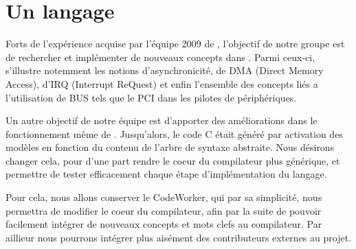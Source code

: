 \documentclass{rtxreport}
\begin{document}
\section{Un langage}

Forts de l'expérience acquise par l'équipe 2009 de \rtx, l'objectif de
notre groupe est de rechercher et implémenter de nouveaux concepts dans
\rtx. Parmi ceux-ci, s'illustre notemment les notions d'asynchronicité,
de DMA (Direct Memory Access), d'IRQ (Interrupt ReQuest) et enfin l'ensemble
des concepts liés a l'utilisation de BUS tels que le PCI dans les pilotes de
périphériques.

Un autre objectif de notre équipe est d'apporter des améliorations dans le
fonctionnement même de \rtx. Jusqu'alors, le code C était généré par
activation des modèles en fonction du contenu de l'arbre de syntaxe abstraite.
Nous désirons changer cela, pour d'une part rendre le coeur du compilateur
plus générique, et permettre de tester efficacement chaque étape
d'implémentation du langage.

Pour cela, nous allons conserver le CodeWorker, qui par sa simplicité, nous
permettra de modifier le coeur du compilateur, afin par la suite de pouvoir
facilement intégrer de nouveaux concepts et mots clefs au compilateur.
Par aillieur nous pourrons intégrer plus aisément des contributeurs externes au projet.
\end{document}

